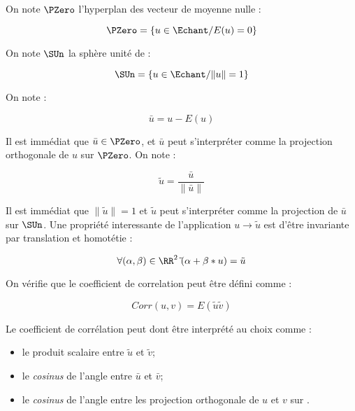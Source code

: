 On note $\PZero$ l'hyperplan des vecteur de moyenne nulle :

\begin{equation}
   \PZero = \{u\in \Echant / E(u)=0\}
\end{equation}

On note $\SUn$ la sph\`ere unit\'e de \Echant :

\begin{equation}
   \SUn = \{u\in \Echant / \|u\|=1 \}
\end{equation}

On note :

\begin{equation}
   \bar{u} = u -E(u)
\end{equation}

Il est imm\'ediat que $\bar{u} \in \PZero$, et $\bar{u}$ peut s'interpr\'eter
comme  la projection orthogonale de $u$ sur $\PZero$. On note :

\begin{equation}
   \tilde{u} = \frac{\bar{u}}{\| \bar{u} \|}
\end{equation}


Il est imm\'ediat que $\|\tilde{u}\|=1$ et $\tilde{u}$ peut s'interpr\'eter
comme la projection de $\bar{u}$ sur $\SUn$. Une propri\'et\'e interessante
de  l'application $u \rightarrow \tilde{u} $ est d'\^etre invariante  par
translation et homot\'etie :

\begin{equation}
  \forall  (\alpha,\beta) \in \RR^2 \; \tilde{}(\alpha+\beta*u) = \tilde{u}
\end{equation}

On v\'erifie  que le coefficient de correlation peut \^etre d\'efini comme :

\begin{equation}
   Corr(u,v) =  E(\tilde{u}\tilde{v})
   \label{Cor:Prod:Scal}
\end{equation}


Le coefficient de corr\'elation peut dont \^etre interpr\'et\'e
au choix comme :

\begin{itemize}
  \item  le produit scalaire entre $\tilde{u}$ et $\tilde{v}$;

  \item  le \emph{cosinus} de l'angle entre $\bar{u}$ et $\bar{v}$; 

  \item  le \emph{cosinus} de l'angle entre les projection orthogonale
         de $u$ et $v$ sur \PZero.
\end{itemize}


